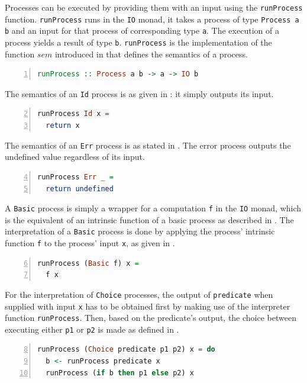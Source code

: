Processes can be executed by providing them with an input using the \texttt{runProcess} function. \texttt{runProcess} runs in the \texttt{IO} monad, it takes a process of type \texttt{Process a b} and an input for that process of corresponding type \texttt{a}. The execution of a process yields a result of type \texttt{b}. \texttt{runProcess} is the implementation of the function $sem$ introduced in  that defines the semantics of a process.
\begin{lstlisting}[language=Haskell,caption=Signature of the process interpreter.,label=lst:local_runprocess_signature,numbers=left,frame=bt]
runProcess :: Process a b -> a -> IO b
\end{lstlisting}

The semantics of an \texttt{Id} process is as given in : it simply outputs its input.
\begin{lstlisting}[language=Haskell,caption=Implementation of the interpreter of \texttt{Id} processes.,label=lst:local_runprocess_const,numbers=left,frame=bt,firstnumber=2]
runProcess Id x =
  return x
\end{lstlisting}

The semantics of an \texttt{Err} process is as stated in . The error process outputs the undefined value regardless of its input.
\begin{lstlisting}[language=Haskell,caption=Implementation of the interpreter of \texttt{Id} processes.,label=lst:local_runprocess_const,numbers=left,frame=bt,firstnumber=4]
runProcess Err _ =
  return undefined
\end{lstlisting}

A \texttt{Basic} process is simply a wrapper for a computation \texttt{f} in the \texttt{IO} monad, which is the equivalent of an intrinsic function of a basic process as described in . The interpretation of a \texttt{Basic} process is done by applying the process' intrinsic function \texttt{f} to the process' input \texttt{x}, as given in .
\begin{lstlisting}[language=Haskell,caption=Implementation of the interpreter for \texttt{Basic} processes.,label=lst:local_runprocess_simple,numbers=left,frame=bt,firstnumber=6]
runProcess (Basic f) x =
  f x
\end{lstlisting}

For the interpretation of \texttt{Choice} processes, the output of \texttt{predicate} when supplied with input \texttt{x} has to be obtained first by making use of the interpreter function \texttt{runProcess}. Then, based on the predicate's output, the choice between executing either \texttt{p1} or \texttt{p2} is made as defined in .
\begin{lstlisting}[language=Haskell,caption=Implementation of the interpreter for \texttt{Choice} processes.,label=lst:local_runprocess_choice,numbers=left,frame=bt,firstnumber=8]
runProcess (Choice predicate p1 p2) x = do
  b <- runProcess predicate x
  runProcess (if b then p1 else p2) x
\end{lstlisting}

